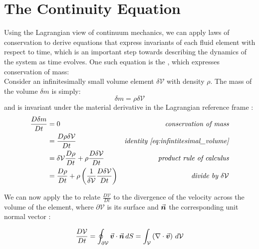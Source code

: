 \section{The Continuity Equation}\label{sec:continuity-equation}
Using the Lagrangian view of continuum mechanics, we can apply laws of conservation to derive equations that express invariants of each fluid element with respect to time, which is an important step towards describing the dynamics of the system as time evolves. One such equation is the , which expresses conservation of mass:\\
Consider an infinitesimally small volume element $\delta \mathcal{V}$ with density $\rho$. The mass of the volume $\delta m$ is simply\autocite*{anderson}:
\begin{equation}\delta m = \rho \delta\mathcal{V}\label{eq:infintitesimal_volume}\end{equation}
and is invariant under the material derivative in the Lagrangian reference frame \autocite*{anderson}:
\begin{align}
    \frac{D\delta m}{D t} & = 0                                                                                                 & \textit{conservation of mass}                    \\
                          & = \frac{D \rho \delta\mathcal{V}}{Dt}                                                               & \textit{identity \ref{eq:infintitesimal_volume}} \\
                          & = \delta\mathcal{V} \frac{D \rho}{Dt} + \rho \frac{D \delta\mathcal{V}}{Dt}                         & \textit{product rule of calculus}                \\\label{eq:cont-eq-unfinished}
                          & =  \frac{D \rho}{Dt} + \rho \left(\frac{1}{\delta\mathcal{V}} \frac{D \delta\mathcal{V}}{Dt}\right) & \textit{divide by $\delta \mathcal{V}$}
\end{align}

We can now apply the  to relate $\frac{D\mathcal{V}}{D t}$ to the divergence of the velocity across the volume of the element, where $\partial \mathcal{V}$ is its surface and $\vec{\bm{n}}$ the corresponding unit normal vector \autocite*{anderson}:

\begin{equation}\label{eq:div-theorem}
    \frac{D\mathcal{V}}{D t} =
    \oint_{\partial \mathcal{V}} \vec{\bm{v}} \cdot \vec{\bm{n}}\, dS =
    \int_{\mathcal{V}} \left( \nabla\cdot \vec{\bm{v}}\right)\,d\mathcal{V}
\end{equation}

